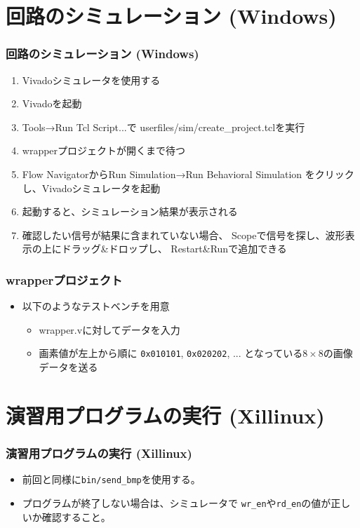 ﻿\documentclass[dvipdfmx]{beamer}
\begin{document}
\section{回路のシミュレーション (Windows)}
\begin{frame}
	\frametitle{回路のシミュレーション (Windows)}
	\begin{enumerate}
		\item
			Vivadoシミュレータを使用する
		\item
			Vivadoを起動
		\item
			Tools→Run Tcl Script...で
			userfiles/sim/create\_project.tclを実行
		\item
			wrapperプロジェクトが開くまで待つ
		\item
			Flow NavigatorからRun Simulation→Run Behavioral Simulation
			をクリックし、Vivadoシミュレータを起動
		\item
			起動すると、シミュレーション結果が表示される
		\item
			確認したい信号が結果に含まれていない場合、
			Scopeで信号を探し、波形表示の上にドラッグ\&ドロップし、
			Restart\&Runで追加できる
	\end{enumerate}
\end{frame}

\begin{frame}[fragile]
	\frametitle{wrapperプロジェクト}
	\begin{itemize}
		\item
			以下のようなテストベンチを用意
			\begin{itemize}
				\item
					wrapper.vに対してデータを入力
					\vfill
				\item
					画素値が左上から順に
					\verb|0x010101|, \verb|0x020202|, ...
					となっている$8\!\times\!8$の画像データを送る
					\vfill
			\end{itemize}
	\end{itemize}
\end{frame}

\section{演習用プログラムの実行 (Xillinux)}
\begin{frame}[fragile]
	\frametitle{演習用プログラムの実行 (Xillinux)}
	\begin{itemize}
		\item
			前回と同様に\verb|bin/send_bmp|を使用する。
			\vfill
		\item
			プログラムが終了しない場合は、シミュレータで
			\verb|wr_en|や\verb|rd_en|の値が正しいか確認すること。
	\end{itemize}
\end{frame}
\end{document}
